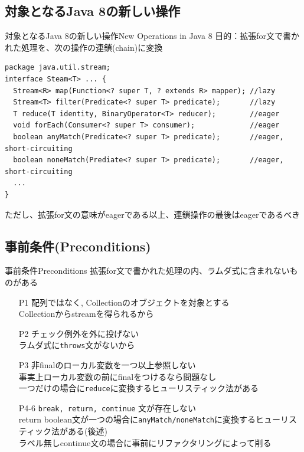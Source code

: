 \subsection{対象となるJava 8の新しい操作}
\begin{frame}[fragile]{対象となるJava 8の新しい操作}{New Operations in Java 8}
目的：拡張for文で書かれた処理を、次の操作の連鎖(chain)に変換
\begin{lstlisting}[keywords={map,filter,reduce,forEach,anyMatch,noneMatch}]
package java.util.stream;
interface Steam<T> ... {
  Stream<R> map(Function<? super T, ? extends R> mapper); //lazy
  Stream<T> filter(Predicate<? super T> predicate);       //lazy
  T reduce(T identity, BinaryOperator<T> reducer);        //eager
  void forEach(Consumer<? super T> consumer);             //eager
  boolean anyMatch(Predicate<? super T> predicate);       //eager, short-circuiting
  boolean noneMatch(Prediate<? super T> predicate);       //eager, short-circuiting
  ...
}
\end{lstlisting}
ただし、拡張for文の意味がeagerである以上、連鎖操作の最後はeagerであるべき
\end{frame}

\subsection{事前条件(Preconditions)}
\begin{frame}{事前条件}{Preconditions}
拡張for文で書かれた処理の内、ラムダ式に含まれないものがある
\begin{itemize}
  \item[P1] 配列ではなく, Collectionのオブジェクトを対象とする\\
            {\small Collectionからstreamを得られるから}
  \item[P2] チェック例外を外に投げない\\
            {\small ラムダ式に\texttt{throws}文がないから}
  \item[P3] 非finalのローカル変数を一つ以上参照しない\\
            {\small 事実上ローカル変数の前にfinalをつけるなら問題なし\\
            一つだけの場合に\texttt{reduce}に変換するヒューリスティック法がある}
  \item[P4-6] \texttt{break, return, continue} 文が存在しない \\
            {\small return boolean文が一つの場合に\texttt{anyMatch/noneMatch}に変換するヒューリスティック法がある(後述) \\
            ラベル無しcontinue文の場合に事前にリファクタリングによって削る}
\end{itemize}
\end{frame}
